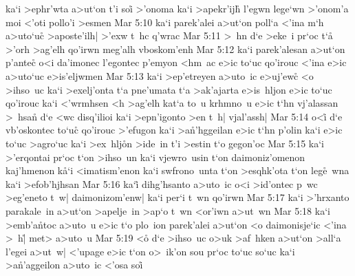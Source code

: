 ka`i
>ephr'wta
a>ut`on
t'i
soi\r{}
>'onoma
ka`i
>apekr'ijh\r{}
l'egwn
lege`wn
>'onom'a
moi
<'oti
pollo'i
>esmen\bibvsend
\vs Mar 5:10
ka`i
parek'alei
a>ut`on
poll`a
<'ina
m`h
a>uto`u\r{c}
>aposte'ilh|
>'exw
t~hc
q'wrac\bibvsend
\vs Mar 5:11
>~hn
d`e
>eke~i
pr`oc
t`a\r{}
>'orh
>ag'elh
qo'irwn
meg'alh
vboskom'enh\bibvsend
\vs Mar 5:12
ka`i
parek'alesan
a>ut`on
p'antec\r{}
o<i
da'imonec
l'egontec
p'emyon
<hm~ac
e>ic
to`uc
qo'irouc
<'ina
e>ic
a>uto`uc
e>is'eljwmen\bibvsend
\vs Mar 5:13
ka`i
>ep'etreyen
a>uto~ic
e>uj'ewc\r{}
<o
>ihso~uc
ka`i
>exelj'onta
t`a
pne'umata
t`a
>ak'ajarta
e>is~hljon
e>ic
to`uc
qo'irouc
ka`i
<'wrmhsen
<h
>ag'elh
kat`a
to~u
krhmno~u
e>ic
t`hn
vj'alassan
>~hsan\r{}
d`e
<wc
disq'ilioi
ka`i
>epn'igonto
>en
t~h|
vjal'assh|\bibvsend
\vs Mar 5:14
o<i\r{}
d`e
vb'oskontec
to`uc\r{}
qo'irouc
>'efugon
ka`i
>a\r{n}'hggeilan
e>ic
t`hn
p'olin
ka`i
e>ic
to`uc
>agro`uc
ka`i
>ex~hlj\r{o}n
>ide~in
t'i
>estin
t`o
gegon'oc\bibvsend
\vs Mar 5:15
ka`i
>'erqontai
pr`oc
t`on
>ihso~un
ka`i
vjewro~usin
t`on
daimoniz'omenon
kaj'hmenon
k\r{a}`i
<imatism'enon
ka`i
swfrono~unta
t`on
>esqhk'ota
t`on
leg\r{e}~wna
ka`i
>efob'hjhsan\bibvsend
\vs Mar 5:16
ka`i\r{}
dihg'hsanto
a>uto~ic
o<i
>id'ontec
p~wc
>eg'eneto
t~w|
daimonizom'enw|
ka`i
per`i
t~wn
qo'irwn\bibvsend
\vs Mar 5:17
ka`i
>'hrxanto
parakale~in
a>ut`on
>apelje~in
>ap`o
t~wn
<or'iwn
a>ut~wn\bibvsend
\vs Mar 5:18
ka`i
>emb'a\r{n}toc
a>uto~u
e>ic
t`o
plo~ion
parek'alei
a>ut`on
<o
daimonisje`ic
<'ina
>~h|\r{}
met>
a>uto~u\bibvsend
\vs Mar 5:19
<o\r{}
d`e
>ihso~uc
o>uk
>af~hken
a>ut`on
>all`a
l'egei
a>ut~w|
<'upage
e>ic
t`on
o>~ik'on
sou
pr`oc
to`uc
so`uc
ka`i
>a\r{n}'aggeilon
a>uto~ic
<'osa
soi\r{}
